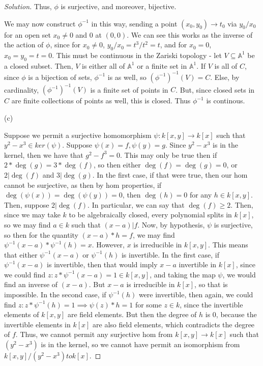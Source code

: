 \documentclass[10pt]{article}
\begin{document}
\begin{proof}[Solution]
Thus, $\phi$ is surjective, and moreover, bijective.

We may now construct $\phi^{-1}$ in this way, sending a point $(x_0,y_0) \to t_0$ via $y_0/x_0$ for an open set $x_0 \not = 0$ and $0$ at $(0,0)$. We can see this works as the inverse of the action of $\phi$, since for $x_0 \not = 0$, $y_0/x_0 = t^3/t^2 = t$, and for $x_0 = 0$, $x_0 = y_0 = t = 0$. This must be continuous in the Zariski topology - let $V \subseteq \mathbb{A}^1$ be a closed subset. Then, $V$ is either all of $ \mathbb{A}^1$ or a finite set in $ \mathbb{A}^1$. If $V$ is all of $C$, since $\phi$ is a bijection of sets, $\phi^{-1}$ is as well, so $(\phi^{-1})^{-1}(V) = C$. Else, by cardinality, $(\phi^{-1})^{-1}(V)$ is a finite set of points in $C$. But, since closed sets in $C$ are finite collections of points as well, this is closed. Thus $\phi^{-1}$ is continous.

(c)


Suppose we permit a surjective homomorphism $\psi: k[x,y] \to k[x]$ such that $y^2 - x^3 \in ker(\psi)$. Suppose $\psi(x) = f, \psi(y) = g$. Since $y^2 - x^3$ is in the kernel, then we have that $g^2 - f^3 = 0$. This may only be true then if $2 * \deg(g) = 3 * \deg(f)$, so then either $\deg(f) = \deg(g) = 0$, or $2 | \deg(f)$ and $3 | \deg(g)$. In the first case, if that were true, then our hom cannot be surjective, as then by hom properties, if $\deg(\psi(x)) = \deg(\psi(y)) = 0$, then $\deg(h) = 0$ for any $h \in k[x,y]$. Then, suppose $2 | \deg(f)$. In particular, we can say that $\deg(f) \geq 2$. Then, since we may take $k$ to be algebraically closed, every polynomial splits in $k[x]$, so we may find $a \in k$ such that $(x-a) | f$. Now, by hypothesis, $\psi$ is surjective, so then for the quantity $(x-a)*h = f$, we may find $\psi^{-1}(x-a) * \psi^{-1}(h) = x$. However, $x$ is irreducible in $k[x,y]$. This means that either $\psi^{-1}(x-a)$ or $\psi^{-1}(h)$ is invertible. In the first case, if $\psi^{-1}(x-a)$ is invertible, then that would imply $x-a$ invertible in $k[x]$, since we could find $z : z *  \psi^{-1}(x-a) = 1 \in k[x,y]$, and taking the map $\psi$, we would find an inverse of $(x-a)$. But $x-a$ is irreducible in $k[x]$, so that is impossible. In the second case, if $\psi^{-1}(h)$ were invertible, then again, we could find $z : z*\psi^{-1}(h) = 1 \implies \psi(z)* h = 1$ for some $z \in k$, since the invertible elements of $k[x,y]$ are field elements. But then the degree of $h$ is 0, because the invertible elements in $k[x]$ are also field elements, which contradicts the degree of $f$. Thus, we cannot permit any surjective hom from $k[x,y] \to k[x]$ such that $(y^2 - x^3)$ is in the kernel, so we cannot have permit an isomorphism from $k[x,y]/(y^2 - x^3) to k[x]$.


\end{proof}
\end{document}
